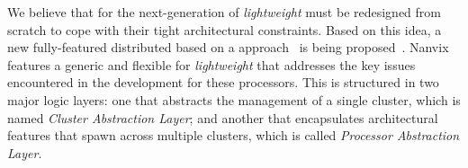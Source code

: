 



	We believe that \oses for the next-generation of \textit{lightweight} \manycores must be
	redesigned from scratch to cope with their tight architectural constraints.
	Based on this idea, a new fully-featured distributed \os based on a \multikernel approach~\cite{Baumann2009}
	is being proposed~\cite{penna2017-1,penna2017-2,penna2019}.
	Nanvix features a generic and flexible \hal for \textit{lightweight} \manycores that
	addresses the key issues encountered in the development for these processors.
	This \hal is structured in two major logic layers: one that abstracts the management
	of a single cluster, which is named \textit{Cluster Abstraction Layer}; and another
	that encapsulates architectural features that spawn across multiple clusters, which
	is called \textit{Processor Abstraction Layer}.

